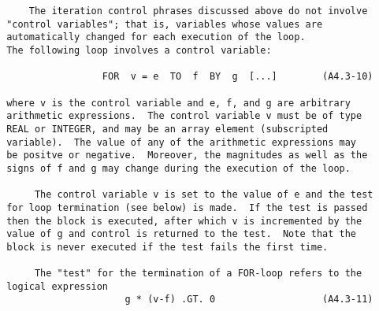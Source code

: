 \begin{verbatim}
     The iteration control phrases discussed above do not involve
 "control variables"; that is, variables whose values are
 automatically changed for each execution of the loop.
 The following loop involves a control variable:
 
                  FOR  v = e  TO  f  BY  g  [...]        (A4.3-10)
 
 where v is the control variable and e, f, and g are arbitrary
 arithmetic expressions.  The control variable v must be of type
 REAL or INTEGER, and may be an array element (subscripted
 variable).  The value of any of the arithmetic expressions may
 be positve or negative.  Moreover, the magnitudes as well as the
 signs of f and g may change during the execution of the loop.
 
      The control variable v is set to the value of e and the test
 for loop termination (see below) is made.  If the test is passed
 then the block is executed, after which v is incremented by the
 value of g and control is returned to the test.  Note that the
 block is never executed if the test fails the first time.
 
      The "test" for the termination of a FOR-loop refers to the
 logical expression
                      g * (v-f) .GT. 0                   (A4.3-11)
\end{verbatim} 
